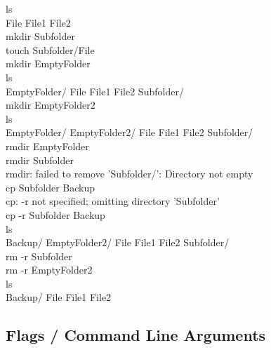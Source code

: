\begin{bash}
\userprompt[~/Folder] ls\\
File  File1  File2\\

\userprompt[~/Folder] mkdir Subfolder\\

\userprompt[~/Folder] touch Subfolder/File\\

\userprompt[~/Folder] mkdir EmptyFolder\\

\userprompt[~/Folder] ls\\
EmptyFolder/  File  File1  File2  Subfolder/\\

\userprompt[~/Folder] mkdir EmptyFolder2\\

\userprompt[~/Folder] ls\\
EmptyFolder/  EmptyFolder2/  File  File1  File2  Subfolder/\\

\userprompt[~/Folder] rmdir EmptyFolder\\

\userprompt[~/Folder] rmdir Subfolder\\
rmdir: failed to remove 'Subfolder/': Directory not empty\\

\userprompt[~/Folder] cp Subfolder Backup\\
cp: -r not specified; omitting directory 'Subfolder'\\

\userprompt[~/Folder] cp -r Subfolder Backup\\

\userprompt[~/Folder] ls\\
Backup/  EmptyFolder2/  File  File1  File2  Subfolder/\\

\userprompt[~/Folder] rm -r Subfolder\\

\userprompt[~/Folder] rm -r EmptyFolder2\\

\userprompt[~/Folder] ls\\
Backup/  File  File1  File2\\
\end{bash}

\subsection{Flags / Command Line Arguments}\label{flags-command-line-arguments}

